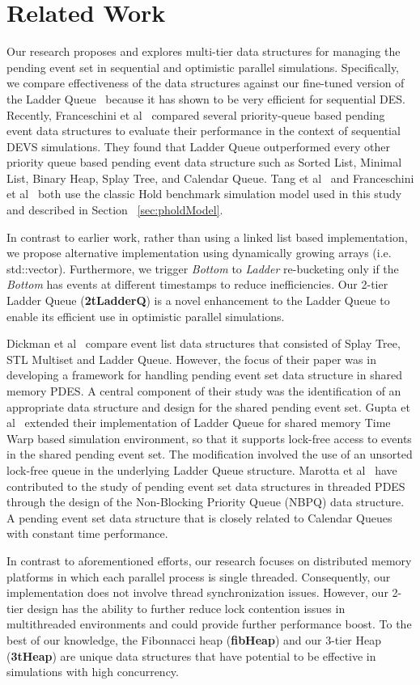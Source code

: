 \section{Related Work}  \label{sec:relevant-work}
Our research proposes and explores multi-tier data structures for managing the pending event set in sequential and optimistic parallel simulations. Specifically, we compare effectiveness of the data structures against our fine-tuned version of the Ladder Queue~\cite{tang-05} because it has shown to be very efficient for sequential DES. Recently, Franceschini et al~\cite{franceschini-15} compared several priority-queue based pending event data structures to evaluate their performance in the context of sequential DEVS simulations. They found that Ladder Queue outperformed every other priority queue based pending event data structure such as Sorted List, Minimal List, Binary Heap, Splay Tree, and Calendar Queue. Tang et al~\cite{tang-05} and Franceschini et al~\cite{franceschini-15} both use the classic Hold benchmark simulation model used in this study and described in Section ~\ref{sec:pholdModel}.

In contrast to earlier work, rather than using a linked list based implementation, we propose alternative implementation using dynamically growing arrays (i.e. std::vector). Furthermore, we trigger \textit{Bottom} to \textit{Ladder} re-bucketing only if the \textit{Bottom} has events at different timestamps to reduce inefficiencies. Our 2-tier Ladder Queue (\textbf{2tLadderQ}) is a novel enhancement to the Ladder Queue to enable its efficient use in optimistic parallel simulations.

Dickman et al~\cite{dickman-13} compare event list data structures that consisted of Splay Tree, STL Multiset and Ladder Queue. However, the focus of their paper was in developing a framework for handling pending event set data structure in shared memory PDES. A central component of their study was the identification of an appropriate data structure and design for the shared pending event set. Gupta et al~\cite{gupta-14} extended their implementation of Ladder Queue for shared memory Time Warp based simulation environment, so that it supports lock-free access to events in the shared pending event set. The modification involved the use of an unsorted lock-free queue in the underlying Ladder Queue structure. Marotta et al~\cite{marotta-16} have contributed to the study of pending event set data structures in threaded PDES through the design of the Non-Blocking Priority Queue (NBPQ) data structure. A pending event set data structure that is closely related to Calendar Queues with constant time performance.

In contrast to aforementioned efforts, our research focuses on distributed memory platforms in which each parallel process is single threaded. Consequently, our implementation does not involve thread synchronization issues. However, our 2-tier design has the ability to further reduce lock contention issues in multithreaded environments and could provide further performance boost. To the best of our knowledge, the Fibonnacci heap (\textbf{fibHeap}) and our 3-tier Heap (\textbf{3tHeap}) are unique data structures that have potential to be effective in simulations with high concurrency.